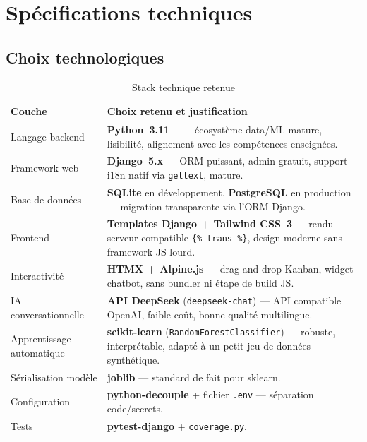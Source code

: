 \section{Spécifications techniques}
\label{sec:specs-tech}

\subsection{Choix technologiques}

\begin{table}[H]
    \centering
    \begin{tabularx}{\textwidth}{lX}
        \toprule
        \textbf{Couche} & \textbf{Choix retenu et justification}\\
        \midrule
        Langage backend & \textbf{Python~3.11+} --- écosystème data/ML
        mature, lisibilité, alignement avec les compétences enseignées.\\
        Framework web & \textbf{Django~5.x} --- ORM puissant, admin
        gratuit, support i18n natif via \texttt{gettext}, mature.\\
        Base de données & \textbf{SQLite} en développement,
        \textbf{PostgreSQL} en production --- migration transparente via
        l'ORM Django.\\
        Frontend & \textbf{Templates Django + Tailwind CSS~3} --- rendu
        serveur compatible \texttt{\{\% trans \%\}}, design moderne sans
        framework JS lourd.\\
        Interactivité & \textbf{HTMX + Alpine.js} --- drag-and-drop Kanban,
        widget chatbot, sans bundler ni étape de build JS.\\
        IA conversationnelle & \textbf{API DeepSeek}
        (\texttt{deepseek-chat}) --- API compatible OpenAI, faible coût,
        bonne qualité multilingue.\\
        Apprentissage automatique & \textbf{scikit-learn}
        (\texttt{RandomForestClassifier}) --- robuste, interprétable,
        adapté à un petit jeu de données synthétique.\\
        Sérialisation modèle & \textbf{joblib} --- standard de fait pour
        sklearn.\\
        Configuration & \textbf{python-decouple} + fichier \texttt{.env}
        --- séparation code/secrets.\\
        Tests & \textbf{pytest-django} + \texttt{coverage.py}.\\
        \bottomrule
    \end{tabularx}
    \caption{Stack technique retenue}
    \label{tab:stack}
\end{table}

